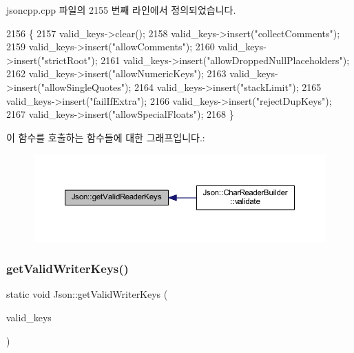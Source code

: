 jsoncpp.\+cpp 파일의 2155 번째 라인에서 정의되었습니다.


\begin{DoxyCode}
2156 \{
2157   valid\_keys->clear();
2158   valid\_keys->insert(\textcolor{stringliteral}{"collectComments"});
2159   valid\_keys->insert(\textcolor{stringliteral}{"allowComments"});
2160   valid\_keys->insert(\textcolor{stringliteral}{"strictRoot"});
2161   valid\_keys->insert(\textcolor{stringliteral}{"allowDroppedNullPlaceholders"});
2162   valid\_keys->insert(\textcolor{stringliteral}{"allowNumericKeys"});
2163   valid\_keys->insert(\textcolor{stringliteral}{"allowSingleQuotes"});
2164   valid\_keys->insert(\textcolor{stringliteral}{"stackLimit"});
2165   valid\_keys->insert(\textcolor{stringliteral}{"failIfExtra"});
2166   valid\_keys->insert(\textcolor{stringliteral}{"rejectDupKeys"});
2167   valid\_keys->insert(\textcolor{stringliteral}{"allowSpecialFloats"});
2168 \}
\end{DoxyCode}
이 함수를 호출하는 함수들에 대한 그래프입니다.\+:\nopagebreak
\begin{figure}[H]
\begin{center}
\leavevmode
\includegraphics[width=350pt]{namespace_json_a8c38450840f3d88e9b981ae132f7ad0a_icgraph}
\end{center}
\end{figure}
\mbox{\label{namespace_json_a77ffcc6bb405332d84c260d304d4384e}} 
\subsubsection{\texorpdfstring{get\+Valid\+Writer\+Keys()}{getValidWriterKeys()}}
{\footnotesize\ttfamily static void Json\+::get\+Valid\+Writer\+Keys (\begin{DoxyParamCaption}\item[{std\+::set$<$ \hyperlink{json_8h_a1e723f95759de062585bc4a8fd3fa4be}{J\+S\+O\+N\+C\+P\+P\+\_\+\+S\+T\+R\+I\+NG} $>$ $\ast$}]{valid\+\_\+keys }\end{DoxyParamCaption})\hspace{0.3cm}{\ttfamily [static]}}




